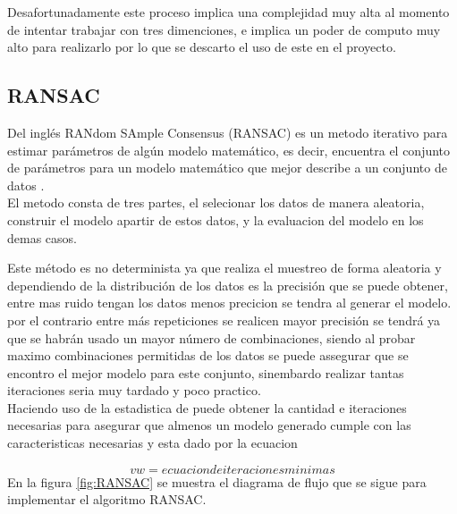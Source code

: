Desafortunadamente este proceso implica una complejidad muy alta al momento de intentar trabajar con tres dimenciones, e implica un poder de computo muy alto para realizarlo por lo que se descarto el uso de este en el proyecto.

\subsection{RANSAC}

Del inglés RANdom SAmple Consensus (RANSAC) es un \gls{metodo} iterativo para estimar parámetros de algún modelo matemático, es decir, encuentra el conjunto de parámetros para un modelo matemático que mejor describe a un conjunto de datos \cite{Fischler1981}. \\

El metodo consta de tres partes, el selecionar los datos de manera aleatoria, construir el modelo apartir de estos datos, y la evaluacion del modelo en los demas casos.

Este método es no determinista ya que realiza el muestreo de forma aleatoria y dependiendo de la distribución de los datos es la precisión que se puede obtener, entre mas ruido tengan los datos menos precicion se tendra al generar el modelo. por el contrario entre más repeticiones se realicen mayor precisión se tendrá ya que se habrán usado un mayor número de combinaciones, siendo al probar maximo combinaciones permitidas de los datos se puede assegurar que se encontro el mejor modelo para este conjunto, sinembardo realizar tantas iteraciones seria muy tardado y poco practico.\\

Haciendo uso de la estadistica de puede obtener la cantidad e iteraciones necesarias para asegurar que almenos un modelo generado cumple con las caracteristicas necesarias y esta dado por la ecuacion

\begin{equation}
vw = ecuacion de iteraciones minimas
\label{iterRansac}
\end{equation}
En la figura \ref{fig:RANSAC} se muestra el diagrama de flujo que se sigue para implementar el \gls{algoritmo} RANSAC.\\


